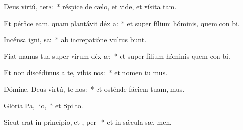\item Deus virtú, tere:~* réspice de cælo, et vide, et vísita  tam.
\item Et pérfice eam, quam plantávit déx a:~* et super fílium hóminis, quem con bi.
\item Incénsa igni,  sa:~* ab increpatióne vultus  bunt.
\item Fiat manus tua super virum déx æ:~* et super fílium hóminis quem con bi.
\item Et non discédimus a te, vibis nos:~* et nomen tu mus.
\item Dómine, Deus virtú, te nos:~* et osténde fáciem tuam,   mus.
\item Glória Pa,  lio,~* et Spi to.
\item Sicut erat in princípio, et ,  per,~* et in sǽcula sæ. men.
